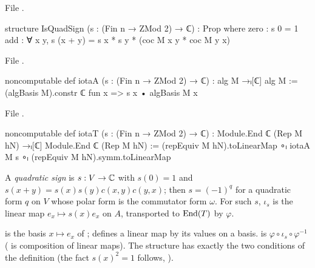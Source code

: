 \noindent File .
\begin{leancode}
structure IsQuadSign (s : (Fin n → ZMod 2) → ℂ) : Prop where
  zero : s 0 = 1
  add : ∀ x y, s (x + y) = s x * s y * (coc M x y * coc M y x)
\end{leancode}
\noindent File .
\begin{leancode}
noncomputable def iotaA (s : (Fin n → ZMod 2) → ℂ) : alg M →ₗ[ℂ] alg M :=
  (algBasis M).constr ℂ fun x => s x • algBasis M x
\end{leancode}
\noindent File .
\begin{leancode}
noncomputable def iotaT (s : (Fin n → ZMod 2) → ℂ) :
    Module.End ℂ (Rep M hN) →ₗ[ℂ] Module.End ℂ (Rep M hN) :=
  (repEquiv M hN).toLinearMap ∘ₗ iotaA M s ∘ₗ (repEquiv M hN).symm.toLinearMap
\end{leancode}
\begin{definition}\label{ch06:def:quadsign}
A \emph{quadratic sign} is $s:V\to{\mathbb{C}}$ with $s(0)=1$ and $s(x+y)=s(x)s(y)c(x,y)c(y,x)$; then
$s=(-1)^q$ for a quadratic form $q$ on $V$ whose polar form is the commutator form $\omega$.
For such $s$, $\iota_s$ is the linear map $e_x\mapsto s(x)e_x$ on $A$, transported to $\operatorname{End}(T)$ by
$\varphi$.
\end{definition}
\begin{dictionary}
 is the basis $x\mapsto e_x$ of ;  defines a linear
map by its values on a basis.   is $\varphi\circ\iota_s\circ\varphi^{-1}$ ( is
composition of linear maps).  The structure  has exactly the two conditions of the
definition (the fact $s(x)^2=1$ follows, ).
\end{dictionary}

